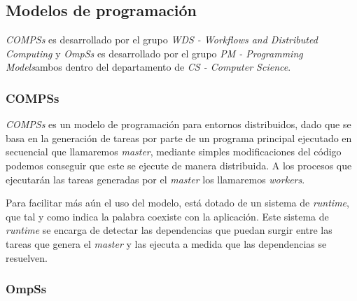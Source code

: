 \documentclass{article}
\begin{document}
\subsection{Modelos de programación}

\textit{COMPSs} es desarrollado por el grupo \textit{WDS - Workflows and Distributed Computing} y \textit{OmpSs} es desarrollado por el grupo \textit{PM - Programming Models}ambos dentro del departamento de \textit{CS - Computer Science}.

\subsubsection{COMPSs}

\textit{COMPSs} es un modelo de programación para entornos distribuidos\cite{badia2015comp}, dado que se basa en la generación de tareas por parte de un programa principal ejecutado en secuencial que llamaremos \textit{master}, mediante simples modificaciones del código podemos conseguir que este se ejecute de manera distribuida. A los procesos que ejecutarán las tareas generadas por el \textit{master} los llamaremos \textit{workers}.  \par\bigskip

Para facilitar más aún el uso del modelo, está dotado de un sistema de \textit{runtime}, que tal y como indica la palabra coexiste con la aplicación. Este sistema de \textit{runtime} se encarga de detectar las dependencias que puedan surgir entre las tareas que genera el \textit{master} y las ejecuta a medida que las dependencias se resuelven. \par\bigskip






\subsubsection{OmpSs}


{}

\end{document}
